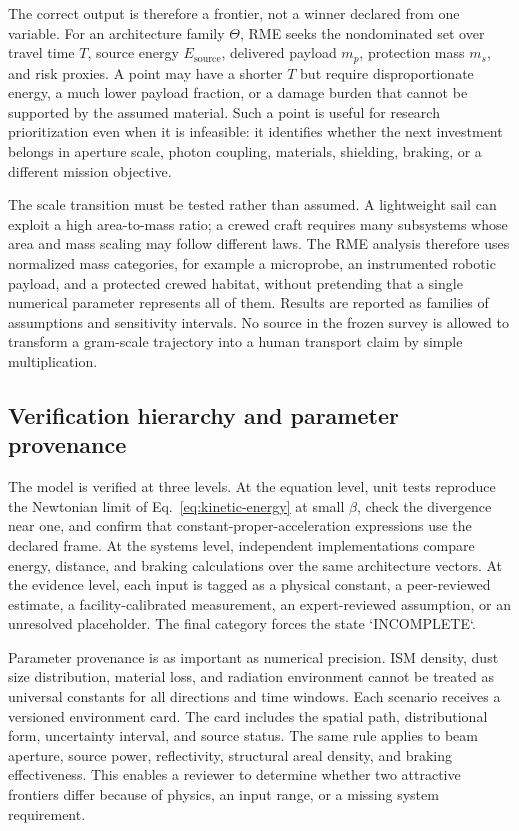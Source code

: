 \documentclass[conference]{../../../../Conference-LaTeX-template_10-17-19/IEEEtran}
\begin{document}
The correct output is therefore a frontier, not a winner declared from one variable. For an architecture family $\Theta$, RME seeks the nondominated set over travel time $T$, source energy $E_{\mathrm{source}}$, delivered payload $m_p$, protection mass $m_s$, and risk proxies. A point may have a shorter $T$ but require disproportionate energy, a much lower payload fraction, or a damage burden that cannot be supported by the assumed material. Such a point is useful for research prioritization even when it is infeasible: it identifies whether the next investment belongs in aperture scale, photon coupling, materials, shielding, braking, or a different mission objective.

The scale transition must be tested rather than assumed. A lightweight sail can exploit a high area-to-mass ratio; a crewed craft requires many subsystems whose area and mass scaling may follow different laws. The RME analysis therefore uses normalized mass categories, for example a microprobe, an instrumented robotic payload, and a protected crewed habitat, without pretending that a single numerical parameter represents all of them. Results are reported as families of assumptions and sensitivity intervals. No source in the frozen survey is allowed to transform a gram-scale trajectory into a human transport claim by simple multiplication.

\subsection{Verification hierarchy and parameter provenance}
The model is verified at three levels. At the equation level, unit tests reproduce the Newtonian limit of Eq.~\eqref{eq:kinetic-energy} at small $\beta$, check the divergence near one, and confirm that constant-proper-acceleration expressions use the declared frame. At the systems level, independent implementations compare energy, distance, and braking calculations over the same architecture vectors. At the evidence level, each input is tagged as a physical constant, a peer-reviewed estimate, a facility-calibrated measurement, an expert-reviewed assumption, or an unresolved placeholder. The final category forces the state `INCOMPLETE`.

Parameter provenance is as important as numerical precision. ISM density, dust size distribution, material loss, and radiation environment cannot be treated as universal constants for all directions and time windows. Each scenario receives a versioned environment card. The card includes the spatial path, distributional form, uncertainty interval, and source status. The same rule applies to beam aperture, source power, reflectivity, structural areal density, and braking effectiveness. This enables a reviewer to determine whether two attractive frontiers differ because of physics, an input range, or a missing system requirement.
\end{document}
